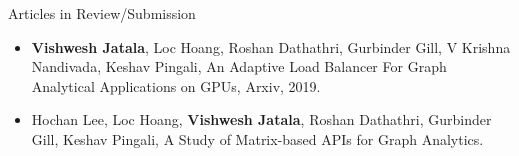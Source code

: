 \documentclass{resume} %
\begin{document}
\begin{rSection}{Articles in Review/Submission}
\begin{itemize}
\item \textbf{Vishwesh Jatala}, Loc Hoang, Roshan Dathathri, Gurbinder Gill, V Krishna Nandivada, Keshav Pingali, An Adaptive Load Balancer For Graph Analytical Applications on GPUs, Arxiv, 2019. 
\item Hochan Lee, Loc Hoang, \textbf{Vishwesh Jatala}, Roshan Dathathri, Gurbinder Gill, Keshav Pingali, A Study of Matrix-based APIs for Graph Analytics.

\end{itemize}
\end{rSection}




\begin{comment}
\begin{rSection}{Ph.D Thesis}{\hspace{6 mm}   \textit{Thesis Supervisor : Prof. Amey Karkare, Department of CSE, IIT Kanpur }}

\begin{itemize}
\item \textbf{Title:} Hardware and Software Optimizations for GPU Resource Management
\end{itemize}

\end{rSection}
\end{comment}

\end{document}
